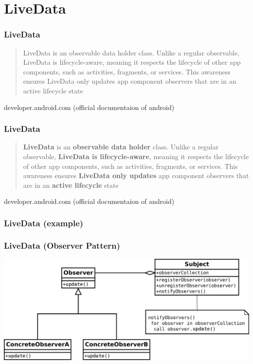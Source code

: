 \documentclass{beamer}
\begin{document}
	\section[Live Data]{LiveData}
	\begin{frame}
		\frametitle{LiveData}
\begin{quote}LiveData is an observable data holder class. Unlike a regular observable, LiveData is lifecycle-aware, meaning it respects the lifecycle of other app components, such as activities, fragments, or services. This awareness ensures LiveData only updates app component observers that are in an active lifecycle state\end{quote} developer.android.com \linebreak(official documentaion of android)
	\end{frame}
	
	\begin{frame}
		\frametitle{LiveData}
		\begin{quote}\textbf{LiveData} is an \textbf{observable data holder} class. Unlike a regular observable, \textbf{LiveData is lifecycle-aware}, meaning it respects the lifecycle of other app components, such as activities, fragments, or services. This awareness ensures \textbf{LiveData only updates} app component observers that are in an \textbf{active lifecycle} state\end{quote} developer.android.com \linebreak(official documentaion of android)
	\end{frame}
	
	\begin{frame}
	\frametitle{LiveData (example)}

	\end{frame}
	
	\begin{frame}
	\frametitle{LiveData (Observer Pattern)}
	\includegraphics[width=1\textwidth]{observerpattern.png}
	\end{frame}
\end{document}
